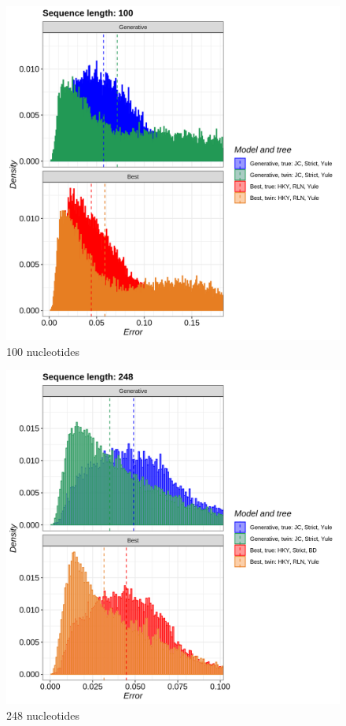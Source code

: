 \begin{figure}[H]
  \includegraphics[width=\textwidth]{pirouette_example_21/errors_100.png}
  \caption{100 nucleotides}
\end{figure}

\begin{figure}[H]
  \includegraphics[width=\textwidth]{pirouette_example_21/errors_248.png}
  \caption{248 nucleotides}
\end{figure}

